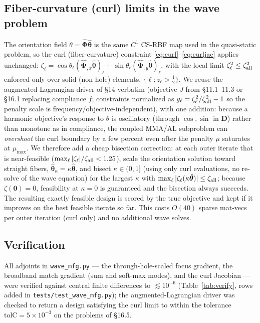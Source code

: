 \documentclass[11pt]{article}
\newcommand{\vthh}{\hat{\bm{\theta}}}
\newcommand{\vD}{\mathbf{D}}
\newcommand{\vPhi}{\hat{\bm{\Phi}}}
\begin{document}
\subsection{Fiber-curvature (curl) limits in the wave problem}
The orientation field $\theta=\vPhi\vthh$ is the same $C^1$ CS-RBF map used in
the quasi-static problem, so the curl (fiber-curvature) constraint
\eqref{eq:curl}--\eqref{eq:curljac} applies unchanged: $\zeta_\ell=\cos
\theta_\ell(\vPhi_{,x}\vthh)_\ell+\sin\theta_\ell(\vPhi_{,y}\vthh)_\ell$, with
the local limit $\zeta_\ell^2\le\zeta_{\rm all}^2$ enforced only over solid
(non-hole) elements, $\{\ell: z_\ell>\tfrac12\}$. We reuse the
augmented-Lagrangian driver of \S14 verbatim (objective $J$ from
\S11.1--11.3 or \S16.1 replacing compliance $f$; constraints normalized as
$g_\ell=\zeta_\ell^2/\zeta_{\rm all}^2-1$ so the penalty scale is
frequency/objective-independent), with one addition: because a harmonic
objective's response to $\theta$ is oscillatory (through $\cos,\sin$ in
$\vD$) rather than monotone as in compliance, the coupled MMA/AL subproblem
can \emph{overshoot} the curl boundary by a few percent even after the
penalty $\mu$ saturates at $\mu_{\max}$. We therefore add a cheap bisection
correction: at each outer iterate that is near-feasible
($\max_\ell|\zeta_\ell|/\zeta_{\rm all}<1.25$), scale the orientation
solution toward straight fibers, $\vthh_\kappa=\kappa\vthh$, and bisect
$\kappa\in(0,1]$ (using only curl evaluations, no re-solve of the wave
equation) for the largest $\kappa$ with $\max_\ell|\zeta_\ell(\kappa\vthh)|
\le\zeta_{\rm all}$; because $\zeta(\mathbf 0)=0$, feasibility at $\kappa=0$
is guaranteed and the bisection always succeeds. The resulting exactly
feasible design is scored by the true objective and kept if it improves on
the best feasible iterate so far. This costs $O(40)$ sparse mat-vecs per
outer iteration (curl only) and no additional wave solves.

\subsection{Verification}
All adjoints in \texttt{wave\_mfg.py} --- the through-hole-scaled focus
gradient, the broadband match gradient (sum and soft-max modes), and the
curl Jacobian --- were verified against central finite differences to
$\lesssim\!10^{-6}$ (Table~\ref{tab:verify}, rows added in
\texttt{tests/test\_wave\_mfg.py}); the augmented-Lagrangian driver was
checked to return a design satisfying the curl limit to within the tolerance
$\text{tolC}=5\times10^{-3}$ on the problems of \S16.5.
\end{document}
